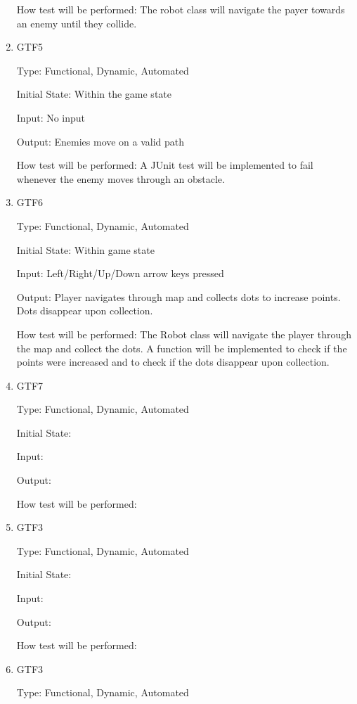 \documentclass[12pt, titlepage]{article}
\begin{document}
\begin{enumerate}
How test will be performed: The robot class will navigate the payer towards an enemy until they collide.

\item{GTF5\\}

Type: Functional, Dynamic, Automated
					
Initial State: Within the game state
					
Input: No input
					
Output: Enemies move on a valid path

How test will be performed: A JUnit test will be implemented to fail whenever the enemy moves through an obstacle.

\item{GTF6\\}

Type: Functional, Dynamic, Automated
					
Initial State: Within game state
					
Input: Left/Right/Up/Down arrow keys pressed
					
Output: Player navigates through map and collects dots to increase points. Dots disappear upon collection.

How test will be performed: The Robot class will navigate the player through the map and collect the dots. A function will be implemented to check if the points were increased and to check if the dots disappear upon collection.

\item{GTF7\\}

Type: Functional, Dynamic, Automated
					
Initial State: 
					
Input: 
					
Output: 

How test will be performed: 

\item{GTF3\\}

Type: Functional, Dynamic, Automated
					
Initial State: 
					
Input: 
					
Output: 

How test will be performed: 

\item{GTF3\\}

Type: Functional, Dynamic, Automated
					

\end{enumerate}
\end{document}
